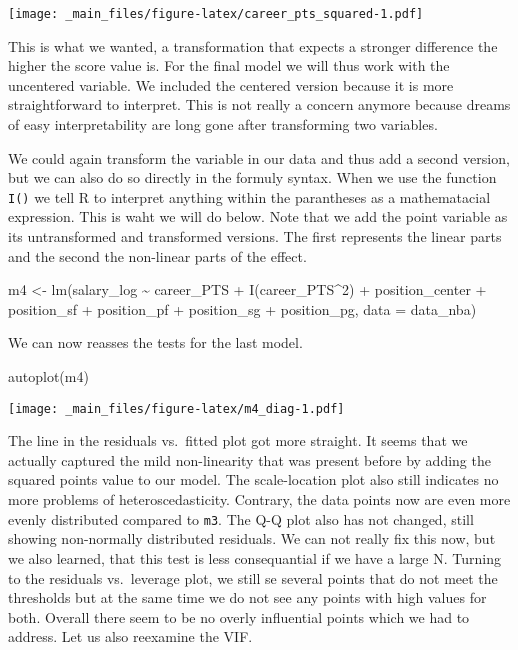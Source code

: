 \documentclass[
]{book}
\newenvironment{Shaded}{\begin{snugshade}}{\end{snugshade}}
\newcommand{\AttributeTok}[1]{\textcolor[rgb]{0.77,0.63,0.00}{#1}}
\newcommand{\AttributeTok}[1]{\textcolor[rgb]{0.13,0.29,0.53}{#1}}
\newcommand{\DecValTok}[1]{\textcolor[rgb]{0.00,0.00,0.81}{#1}}
\newcommand{\FunctionTok}[1]{\textcolor[rgb]{0.00,0.00,0.00}{#1}}
\newcommand{\FunctionTok}[1]{\textcolor[rgb]{0.13,0.29,0.53}{\textbf{#1}}}
\newcommand{\NormalTok}[1]{#1}
\newcommand{\OtherTok}[1]{\textcolor[rgb]{0.56,0.35,0.01}{#1}}
\newcommand{\SpecialCharTok}[1]{\textcolor[rgb]{0.00,0.00,0.00}{#1}}
\newcommand{\SpecialCharTok}[1]{\textcolor[rgb]{0.81,0.36,0.00}{\textbf{#1}}}
\begin{document}
\texttt{[image: \_main\_files/figure-latex/career\_pts\_squared-1.pdf]}

This is what we wanted, a transformation that expects a stronger difference the
higher the score value is. For the final model we will thus work with the
uncentered variable. We included the centered version because it is more
straightforward to interpret. This is not really a concern anymore because
dreams of easy interpretability are long gone after transforming two variables.

We could again transform the variable in our data and thus add a second version,
but we can also do so directly in the formuly syntax. When we use the function
\texttt{I()} we tell R to interpret anything within the parantheses as a mathematacial
expression. This is waht we will do below. Note that we add the point variable
as its untransformed and transformed versions. The first represents the linear
parts and the second the non-linear parts of the effect.

\begin{Shaded}
\begin{Highlighting}[]
\NormalTok{m4 }\OtherTok{\textless{}{-}} \FunctionTok{lm}\NormalTok{(salary\_log }\SpecialCharTok{\textasciitilde{}}\NormalTok{ career\_PTS }\SpecialCharTok{+} \FunctionTok{I}\NormalTok{(career\_PTS}\SpecialCharTok{\^{}}\DecValTok{2}\NormalTok{) }\SpecialCharTok{+}\NormalTok{ position\_center }\SpecialCharTok{+}\NormalTok{ position\_sf }\SpecialCharTok{+}\NormalTok{ position\_pf }\SpecialCharTok{+}\NormalTok{ position\_sg }\SpecialCharTok{+}\NormalTok{ position\_pg, }\AttributeTok{data =}\NormalTok{ data\_nba)}
\end{Highlighting}
\end{Shaded}

We can now reasses the tests for the last model.

\begin{Shaded}
\begin{Highlighting}[]
\FunctionTok{autoplot}\NormalTok{(m4)}
\end{Highlighting}
\end{Shaded}

\texttt{[image: \_main\_files/figure-latex/m4\_diag-1.pdf]}

The line in the residuals vs.~fitted plot got more straight. It seems that we
actually captured the mild non-linearity that was present before by adding the
squared points value to our model. The scale-location plot also still indicates
no more problems of heteroscedasticity. Contrary, the data points now are even
more evenly distributed compared to \texttt{m3}. The Q-Q plot also has not changed,
still showing non-normally distributed residuals. We can not really fix this
now, but we also learned, that this test is less consequantial if we have a
large N. Turning to the residuals vs.~leverage plot, we still se several points
that do not meet the thresholds but at the same time we do not see any points
with high values for both. Overall there seem to be no overly influential points
which we had to address. Let us also reexamine the VIF.
\end{document}
